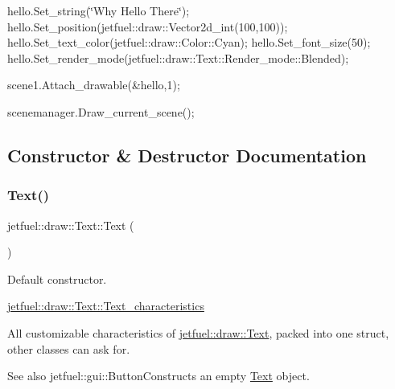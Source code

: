 hello.\+Set\+\_\+string(\char`\"{}\+Why Hello There\char`\"{}); hello.\+Set\+\_\+position(jetfuel\+::draw\+::\+Vector2d\+\_\+int(100,100)); hello.\+Set\+\_\+text\+\_\+color(jetfuel\+::draw\+::\+Color\+::\+Cyan); hello.\+Set\+\_\+font\+\_\+size(50); hello.\+Set\+\_\+render\+\_\+mode(jetfuel\+::draw\+::\+Text\+::\+Render\+\_\+mode\+::\+Blended);

scene1.\+Attach\+\_\+drawable(\&hello,1);

scenemanager.\+Draw\+\_\+current\+\_\+scene(); 

\subsection{Constructor \& Destructor Documentation}
\mbox{\label{classjetfuel_1_1draw_1_1Text_a8b6aed199242a7c69fda591d8769ced9}} 
\subsubsection{\texorpdfstring{Text()}{Text()}\hspace{0.1cm}{\footnotesize\ttfamily [1/2]}}
{\footnotesize\ttfamily jetfuel\+::draw\+::\+Text\+::\+Text (\begin{DoxyParamCaption}{ }\end{DoxyParamCaption})\hspace{0.3cm}{\ttfamily [inline]}}



Default constructor. 

\hyperlink{structjetfuel_1_1draw_1_1Text_1_1Text__characteristics}{jetfuel\+::draw\+::\+Text\+::\+Text\+\_\+characteristics}

All customizable characteristics of \hyperlink{classjetfuel_1_1draw_1_1Text}{jetfuel\+::draw\+::\+Text}, packed into one struct, other classes can ask for.

\begin{DoxySeeAlso}{See also}
jetfuel\+::gui\+::\+Button\+Constructs an empty \hyperlink{classjetfuel_1_1draw_1_1Text}{Text} object. 
\end{DoxySeeAlso}
\mbox{\label{classjetfuel_1_1draw_1_1Text_a792d23b62a66af2558bc7165e5419992}} 
